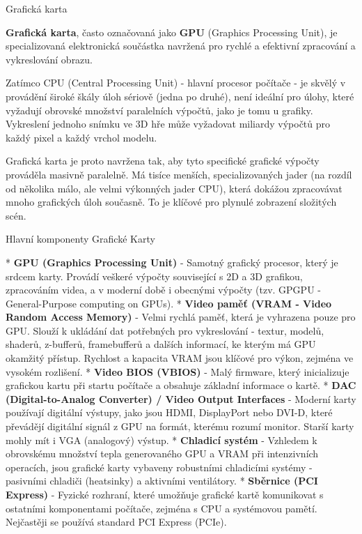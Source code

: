 \chap Grafická karta

{\bf Grafická karta}, často označovaná jako {\bf GPU} (Graphics Processing Unit), je specializovaná elektronická součástka navržená pro rychlé a efektivní zpracování a vykreslování obrazu.

Zatímco CPU (Central Processing Unit) - hlavní procesor počítače - je skvělý v provádění široké škály úloh sériově (jedna po druhé), není ideální pro úlohy, které vyžadují obrovské množství paralelních výpočtů, jako je tomu u grafiky. Vykreslení jednoho snímku ve 3D hře může vyžadovat miliardy výpočtů pro každý pixel a každý vrchol modelu.

Grafická karta je proto navržena tak, aby tyto specifické grafické výpočty prováděla masivně paralelně. Má tisíce menších, specializovaných jader (na rozdíl od několika málo, ale velmi výkonných jader CPU), která dokážou zpracovávat mnoho grafických úloh současně. To je klíčové pro plynulé zobrazení složitých scén.


\sec Hlavní komponenty Grafické Karty

\begitems
* {\bf GPU (Graphics Processing Unit)} - Samotný grafický procesor, který je srdcem karty. Provádí veškeré výpočty související s 2D a 3D grafikou, zpracováním videa, a v moderní době i obecnými výpočty (tzv. GPGPU - General-Purpose computing on GPUs).
* {\bf Video paměť (VRAM - Video Random Access Memory)} - Velmi rychlá paměť, která je vyhrazena pouze pro GPU. Slouží k ukládání dat potřebných pro vykreslování - textur, modelů, shaderů, z-bufferů, framebufferů a dalších informací, ke kterým má GPU okamžitý přístup. Rychlost a kapacita VRAM jsou klíčové pro výkon, zejména ve vysokém rozlišení.
* {\bf Video BIOS (VBIOS)} - Malý firmware, který inicializuje grafickou kartu při startu počítače a obsahuje základní informace o kartě.
* {\bf DAC (Digital-to-Analog Converter) / Video Output Interfaces} - Moderní karty používají digitální výstupy, jako jsou HDMI, DisplayPort nebo DVI-D, které převádějí digitální signál z GPU na formát, kterému rozumí monitor. Starší karty mohly mít i VGA (analogový) výstup.
* {\bf Chladicí systém} - Vzhledem k obrovskému množství tepla generovaného GPU a VRAM při intenzivních operacích, jsou grafické karty vybaveny robustními chladicími systémy - pasivními chladiči (heatsinky) a aktivními ventilátory.
* {\bf Sběrnice (PCI Express)} - Fyzické rozhraní, které umožňuje grafické kartě komunikovat s ostatními komponentami počítače, zejména s CPU a systémovou pamětí. Nejčastěji se používá standard PCI Express (PCIe).
\enditems

